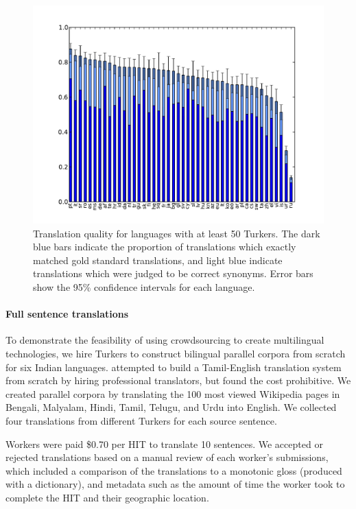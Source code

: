 \documentclass[11pt]{article}
\begin{document}
\begin{figure}[h]
\begin{center}
\includegraphics[width=.7\linewidth]{figures/quality_bar.pdf}
\caption{Translation quality for languages with at least 50 Turkers. The dark blue bars indicate the proportion of translations which exactly matched gold standard translations, and light blue indicate translations which were judged to be correct synonyms. Error bars show the 95\% confidence intervals for each language.}
\label{hitlangqual} 
\end{center}
\end{figure}

\paragraph{Full sentence translations}
To demonstrate the feasibility of using crowdsourcing to create multilingual technologies, we hire Turkers to construct bilingual parallel corpora from scratch for six Indian languages.   attempted to build a Tamil-English translation system from scratch by hiring professional translators, but found the cost prohibitive. We created parallel corpora by translating the 100 most viewed Wikipedia pages in Bengali, Malyalam, Hindi, Tamil, Telugu, and Urdu into English.  We collected four translations from different Turkers for each source sentence.  

Workers were paid \$0.70 per HIT to translate 10 sentences.  
 We  accepted or rejected translations based on a manual review of each worker's submissions, which included a comparison of the translations to a monotonic gloss (produced with a dictionary), and metadata such as the amount of time the worker took to complete the HIT and their geographic location.
\end{document}
